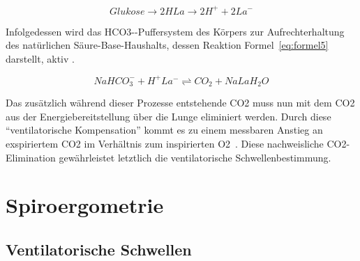 \begin{equation}
Glukose \rightarrow 2 HLa \rightarrow 2 H^+ + 2 La^-
\label{eq:formel4}
\end{equation}

Infolgedessen wird das \acl{HCO3-}-Puffersystem des Körpers zur Aufrechterhaltung des natürlichen Säure-Base-Haushalts, dessen Reaktion Formel~\eqref{eq:formel5} darstellt, aktiv \cite{Kroidl.2015}.

\begin{equation}
NaHCO_3^- + H^+ La^- \rightleftharpoons CO_2 + NaLa H_2O
\label{eq:formel5}
\end{equation}

Das zusätzlich während dieser Prozesse entstehende \acs{CO2} muss nun mit dem \acs{CO2} aus der Energiebereitstellung über die Lunge eliminiert werden. Durch diese "`ventilatorische Kompensation"' kommt es zu einem messbaren Anstieg an exspiriertem \acs{CO2} im Verhältnis zum inspirierten \acs{O2}~\cite{Boening.2008}. Diese nachweisliche \ac{CO2}-Elimination gewährleistet letztlich die ventilatorische Schwellenbestimmung.\\

\section{Spiroergometrie}

\subsection{Ventilatorische Schwellen}

